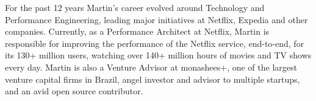 For the past 12 years Martin's career evolved around Technology and Performance Engineering, leading major initiatives at Netflix, Expedia and other companies. Currently, as a Performance Architect at Netflix, Martin is responsible for improving the performance of the Netflix service, end-to-end, for its 130+ million users, watching over 140+ million hours of movies and TV shows every day. Martin is also a Venture Advisor at monashees+, one of the largest venture capital firms in Brazil, angel investor and advisor to multiple startups, and an avid open source contributor.